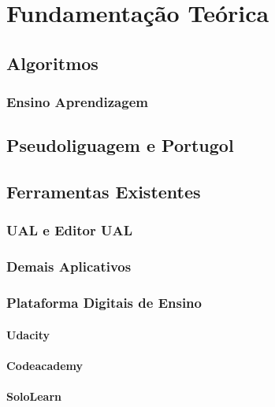 
\chapter{Fundamentação Teórica}

\section{Algoritmos}

\subsection{Ensino Aprendizagem}


\section{Pseudoliguagem e Portugol}

\section{Ferramentas Existentes}

\subsection{UAL e Editor UAL}

\subsection{Demais Aplicativos}

\subsection{Plataforma Digitais de Ensino}

\subsubsection{Udacity}

\subsubsection{Codeacademy}

\subsubsection{SoloLearn}

